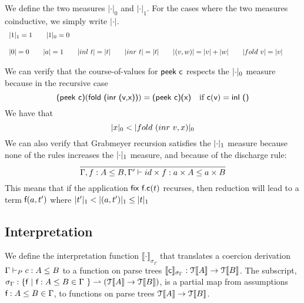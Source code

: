\documentclass[a4paper,UKenglish,cleveref, autoref, thm-restate]{lipics-v2021}
\begin{document}
\begin{definition}
We define the two measures $|\cdot|_0$ and $|\cdot|_1$. For the cases where the two measures coinductive, we simply write $|\cdot|$.
  \begin{displaymath}
    \begin{array}{lll}
\onem{1} = 1 \qquad \zerom{1} = 0
\\\\
 \measure{0} = 0 \qquad \measure{a} = 1 \qquad \measure{inl~ t} = \measure{t} \qquad \measure{inr~ t} = \measure{t} \qquad  \measure{(v,w)}=\measure{v}+\measure{w} \qquad  \measure{fold~v}=\measure{v}\qquad


    \end{array}
  \end{displaymath}
\end{definition}
We can verify that the course-of-values for $\textsf{peek c}$ respects the $\zerom{\cdot}$ measure because in the recursive case \[\textsf{(peek c)}(\textsf{fold (inr (v,x))})=\textsf{(peek c)(x)}\quad \text{if }\textsf{c}(\textsf{v})=\textsf{inl ()}\]
We have that 
\[ \zerom{x} < \zerom{fold~ (inr~ v,x)}\]
We can also verify that Grabmeyer recursion satisfies the $\onem{\cdot}$ measure because none of the rules increases the $\onem{\cdot}$ measure, and because of the discharge rule:
\[\infer{\contains{\Gamma, f : A \leq B, \Gamma'}{id \times f}{a \times A}{a \times B}}{}\]
This means that if the application $\textsf{fix f.c}(t)$ recurses, then reduction will lead to a term $\textsf{f}(a,t')$ where $\onem{t'} < \onem{(a,t')}\leq \onem{t}$\\
\subsection{Interpretation}
We define the interpretation function $\llbracket \cdot \rrbracket_{\sigma_{\Gamma}}$ that translates a coercion derivation $\containsG{c}{A}{B}$ to a function on parse trees $\llbracket \textsf{c} \rrbracket_{\sigma_{\Gamma}} : \mathcal{T}\llbracket A \rrbracket  \rightarrow \mathcal{T}\llbracket B \rrbracket$. The subscript, $\sigma_{\Gamma} : \{ \textsf{f} ~|~\textsf{f} : A \leq B  \in \Gamma \ \} \rightharpoonup  (\mathcal{T}\llbracket A \rrbracket \rightarrow \mathcal{T}\llbracket B \rrbracket)$, is a partial map from assumptions $\textsf{f} : A \leq B  \in \Gamma$, to functions on parse trees $\mathcal{T}\llbracket A \rrbracket \rightarrow \mathcal{T}\llbracket B \rrbracket$. 
\end{document}
